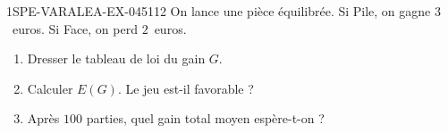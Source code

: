 \begin{exercice}{1SPE-VARALEA-EX-045}{1}{12}
On lance une pièce équilibrée. Si Pile, on gagne $3$~euros. Si Face, on perd $2$~euros.

\begin{enumerate}
  \item Dresser le tableau de loi du gain $G$.
  \item Calculer $E(G)$. Le jeu est-il favorable ?
  \item Après $100$ parties, quel gain total moyen espère-t-on ?
\end{enumerate}
\end{exercice}
